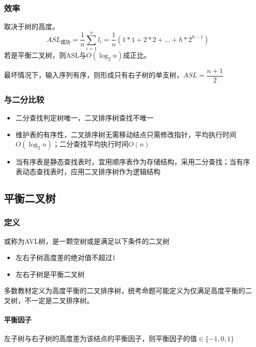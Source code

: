 \subsubsection{效率}
取决于树的高度。
\[ASL_{\text{成功}} = \dfrac{1}{n}\sum_{i = 1}^nl_i = \dfrac{1}{n}(1 * 1 + 2 * 2 + ... + h * 2^{h - 1})\]
若是平衡二叉树，则ASL与\(O(\log_2n)\)成正比。

最坏情况下，输入序列有序，则形成只有右子树的单支树，\(ASL = \dfrac{n + 1}{2}\)


\subsubsection{与二分比较}
\begin{itemize}
    \item 二分查找判定树唯一，二叉排序树查找不唯一
    \item 维护表的有序性，二叉排序树无需移动结点只需修改指针，平均执行时间\(O(\log_2n)\)；二分查找平均执行时间\(O(n)\)
    \item 当有序表是静态查找表时，宜用顺序表作为存储结构，采用二分查找；当有序表动态查找表时，应用二叉排序树作为逻辑结构
\end{itemize}


\subsection{平衡二叉树}\label{平衡二叉树}

\subsubsection{定义}
或称为AVL树，是一颗空树或是满足以下条件的二叉树
\begin{itemize}
    \item 左右子树高度差的绝对值不超过1
    \item 左右子树是平衡二叉树
\end{itemize}

多数教材定义为高度平衡的二叉排序树，统考命题可能定义为仅满足高度平衡的二叉树，不一定是二叉排序树。


\paragraph{平衡因子}
左子树与右子树的高度差为该结点的平衡因子，则平衡因子的值\(\in \{-1, 0, 1\}\)


